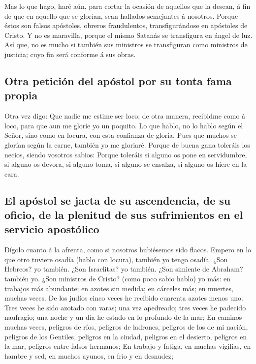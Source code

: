  Mas lo que hago, haré aún, para cortar la ocasión de
aquellos que la desean, á fin de que en aquello que se glorían, sean
hallados semejantes á nosotros.  Porque éstos son falsos
apóstoles, obreros fraudulentos, transfigurándose en apóstoles de
Cristo.  Y no es maravilla, porque el mismo Satanás se
transfigura en ángel de luz.  Así que, no es mucho si
también sus ministros se transfiguran como ministros de justicia; cuyo
fin será conforme á sus obras.

\hypertarget{otra-peticiuxf3n-del-apuxf3stol-por-su-tonta-fama-propia}{%
\subsection{Otra petición del apóstol por su tonta fama
propia}\label{otra-peticiuxf3n-del-apuxf3stol-por-su-tonta-fama-propia}}

 Otra vez digo: Que nadie me estime ser loco; de otra
manera, recibidme como á loco, para que aun me gloríe yo un poquito.
 Lo que hablo, no lo hablo según el Señor, sino como en
locura, con esta confianza de gloria.  Pues que muchos se
glorían según la carne, también yo me gloriaré.  Porque de
buena gana toleráis los necios, siendo vosotros sabios: 
Porque toleráis si alguno os pone en servidumbre, si alguno os devora,
si alguno toma, si alguno se ensalza, si alguno os hiere en la cara.

\hypertarget{el-apuxf3stol-se-jacta-de-su-ascendencia-de-su-oficio-de-la-plenitud-de-sus-sufrimientos-en-el-servicio-apostuxf3lico}{%
\subsection{El apóstol se jacta de su ascendencia, de su oficio, de la
plenitud de sus sufrimientos en el servicio
apostólico}\label{el-apuxf3stol-se-jacta-de-su-ascendencia-de-su-oficio-de-la-plenitud-de-sus-sufrimientos-en-el-servicio-apostuxf3lico}}

 Dígolo cuanto á la afrenta, como si nosotros hubiésemos
sido flacos. Empero en lo que otro tuviere osadía (hablo con locura),
también yo tengo osadía.  ¿Son Hebreos? yo también. ¿Son
Israelitas? yo también. ¿Son simiente de Abraham? también yo.
 ¿Son ministros de Cristo? (como poco sabio hablo) yo más:
en trabajos más abundante; en azotes sin medida; en cárceles más; en
muertes, muchas veces.  De los judíos cinco veces he
recibido cuarenta azotes menos uno.  Tres veces he sido
azotado con varas; una vez apedreado; tres veces he padecido naufragio;
una noche y un día he estado en lo profundo de la mar;  En
caminos muchas veces, peligros de ríos, peligros de ladrones, peligros
de los de mi nación, peligros de los Gentiles, peligros en la ciudad,
peligros en el desierto, peligros en la mar, peligros entre falsos
hermanos;  En trabajo y fatiga, en muchas vigilias, en
hambre y sed, en muchos ayunos, en frío y en desnudez;

